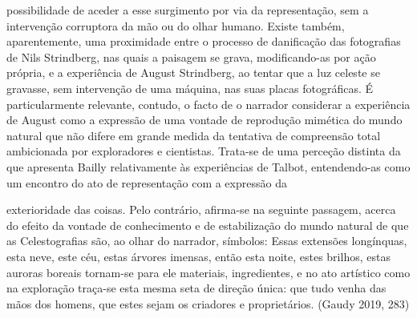 \documentclass{article}
\begin{document}
possibilidade de aceder a esse surgimento por via da representação, sem a intervenção corruptora da mão ou do olhar humano. Existe também, aparentemente, uma
proximidade entre o processo de danificação das fotografias de Nils Strindberg, nas
quais a paisagem se grava, modificando-as por ação própria, e a experiência de August Strindberg, ao tentar que a luz celeste se gravasse, sem intervenção de uma
máquina, nas suas placas fotográficas. É particularmente relevante, contudo, o facto
de o narrador considerar a experiência de August como a expressão de uma vontade
de reprodução mimética do mundo natural que não difere em grande medida da tentativa de compreensão total ambicionada por exploradores e cientistas. Trata-se de
uma perceção distinta da que apresenta Bailly relativamente às experiências de Talbot, entendendo-as como um encontro do ato de representação com a expressão da




exterioridade das coisas. Pelo contrário, afirma-se na seguinte passagem, acerca do
efeito da vontade de conhecimento e de estabilização do mundo natural de que as
Celestografias são, ao olhar do narrador, símbolos:
Essas extensões longínquas, esta neve, este céu, estas árvores imensas, então
esta noite, estes brilhos, estas auroras boreais tornam-se para ele materiais, ingredientes, e no ato artístico como na exploração traça-se esta mesma seta de
direção única: que tudo venha das mãos dos homens, que estes sejam os criadores
e proprietários. (Gaudy 2019, 283)
\end{document}
